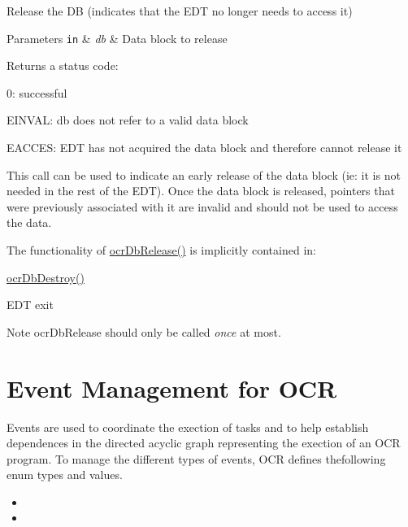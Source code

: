Release the D\-B (indicates that the E\-D\-T no longer needs to access it) 


\begin{DoxyParams}[1]{Parameters}
\mbox{\tt in}  & {\em db} & Data block to release\\
\hline
\end{DoxyParams}
\begin{DoxyReturn}{Returns}
a status code\-:
\begin{DoxyItemize}
\item 0\-: successful
\item E\-I\-N\-V\-A\-L\-: db does not refer to a valid data block
\item E\-A\-C\-C\-E\-S\-: E\-D\-T has not acquired the data block and therefore cannot release it 
\end{DoxyItemize}
\end{DoxyReturn}

\descr
This call can be used to indicate an early release of the data block (ie\-: it is not needed in the rest of the E\-D\-T). Once the data block is released, pointers that were previously associated with it are invalid and should not be used to access the data.

The functionality of \hyperlink{group__OCRDataBlock_ga2ec03c0b0998bdaf9ccc44a06fb05ca0}{ocr\-Db\-Release()} is implicitly contained in\-:
\begin{DoxyItemize}
\item \hyperlink{group__OCRDataBlock_gabc80ea5594e5e55a541a1df4c7727821}{ocr\-Db\-Destroy()}
\item E\-D\-T exit
\end{DoxyItemize}

\begin{DoxyNote}{Note}
ocr\-Db\-Release should only be called {\itshape once} at most.
\end{DoxyNote}

\section{Event Management for OCR}
\label{sec:OCReventManagement}

Events are  used to coordinate the exection of tasks and to 
help establish dependences in the directed acyclic graph representing the exection of an OCR program.
To manage the different types of events, OCR defines thefollowing enum types and values.
\begin{itemize}
\item {}

\item {}

\end{itemize}


